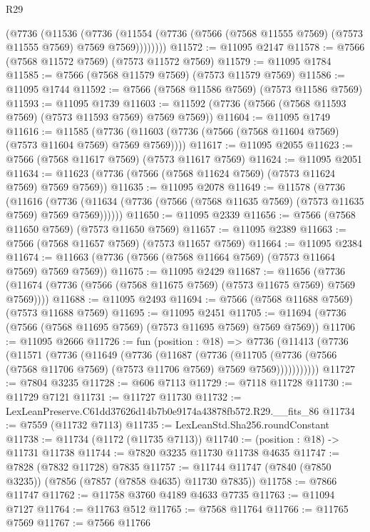 \begin{lexlean}{R29}
\begin{coremodule}
        (@7736
          (@11536
            (@7736
              (@11554 (@7736 (@7566 (@7568 @11555 @7569) (@7573 @11555 @7569) @7569 @7569))))))))
@11572 := @11095 @2147
@11578 := @7566 (@7568 @11572 @7569) (@7573 @11572 @7569)
@11579 := @11095 @1784
@11585 := @7566 (@7568 @11579 @7569) (@7573 @11579 @7569)
@11586 := @11095 @1744
@11592 := @7566 (@7568 @11586 @7569) (@7573 @11586 @7569)
@11593 := @11095 @1739
@11603 := @11592 (@7736 (@7566 (@7568 @11593 @7569) (@7573 @11593 @7569) @7569 @7569))
@11604 := @11095 @1749
@11616 := @11585
    (@7736 (@11603 (@7736 (@7566 (@7568 @11604 @7569) (@7573 @11604 @7569) @7569 @7569))))
@11617 := @11095 @2055
@11623 := @7566 (@7568 @11617 @7569) (@7573 @11617 @7569)
@11624 := @11095 @2051
@11634 := @11623 (@7736 (@7566 (@7568 @11624 @7569) (@7573 @11624 @7569) @7569 @7569))
@11635 := @11095 @2078
@11649 := @11578
    (@7736
      (@11616
        (@7736 (@11634 (@7736 (@7566 (@7568 @11635 @7569) (@7573 @11635 @7569) @7569 @7569))))))
@11650 := @11095 @2339
@11656 := @7566 (@7568 @11650 @7569) (@7573 @11650 @7569)
@11657 := @11095 @2389
@11663 := @7566 (@7568 @11657 @7569) (@7573 @11657 @7569)
@11664 := @11095 @2384
@11674 := @11663 (@7736 (@7566 (@7568 @11664 @7569) (@7573 @11664 @7569) @7569 @7569))
@11675 := @11095 @2429
@11687 := @11656
    (@7736 (@11674 (@7736 (@7566 (@7568 @11675 @7569) (@7573 @11675 @7569) @7569 @7569))))
@11688 := @11095 @2493
@11694 := @7566 (@7568 @11688 @7569) (@7573 @11688 @7569)
@11695 := @11095 @2451
@11705 := @11694 (@7736 (@7566 (@7568 @11695 @7569) (@7573 @11695 @7569) @7569 @7569))
@11706 := @11095 @2666
@11726 := fun (position : @18) =>
  @7736
    (@11413
      (@7736
        (@11571
          (@7736
            (@11649
              (@7736
                (@11687
                  (@7736
                    (@11705
                      (@7736 (@7566 (@7568 @11706 @7569) (@7573 @11706 @7569) @7569 @7569)))))))))))
@11727 := @7804 @3235
@11728 := @606 @7113
@11729 := @7118 @11728
@11730 := @11729 @7121
@11731 := @11727 @11730
@11732 := LexLeanPreserve.C61dd37626d14b7b0e9174a43878fb572.R29.__fits_86
@11734 := @7559 (@11732 @7113)
@11735 := LexLeanStd.Sha256.roundConstant
@11738 := @11734 (@1172 (@11735 @7113))
@11740 := (position : @18) -> @11731 @11738
@11744 := @7820 @3235 @11730 @11738 @4635
@11747 := @7828 (@7832 @11728) @7835
@11757 := @11744 @11747 (@7840 (@7850 @3235)) (@7856 (@7857 (@7858 @4635) @11730 @7835))
@11758 := @7866 @11747
@11762 := @11758 @3760 @4189 @4633 @7735
@11763 := @11094 @7127
@11764 := @11763 @512
@11765 := @7568 @11764
@11766 := @11765 @7569
@11767 := @7566 @11766

\end{coremodule}
\end{lexlean}
